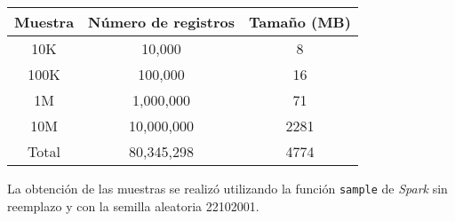 \begin{center}
\begin{tabular}{|ccc|}
  \hline
 Muestra & Número de registros & Tamaño (MB) \\ 
  \hline
  10K & 10,000 & 8 \\ 
  100K & 100,000 & 16 \\ 
  1M & 1,000,000 & 71 \\ 
  10M & 10,000,000 & 2281 \\ 
  Total & 80,345,298 & 4774 \\ 
   \hline
\end{tabular}
\end{center}

La obtención de las muestras se realizó utilizando la función \texttt{sample} de \textit{Spark} sin reemplazo y con la semilla aleatoria 22102001.